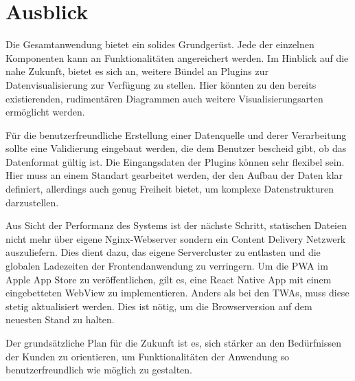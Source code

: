 \chapter{Ausblick}
\label{chap:ausblick}

Die Gesamtanwendung bietet ein solides Grundgerüst. Jede der einzelnen Komponenten
kann an Funktionalitäten angereichert werden. Im Hinblick auf die nahe Zukunft, bietet es sich an,
weitere Bündel an Plugins zur Datenvisualisierung zur Verfügung zu stellen. Hier könnten
zu den bereits existierenden, rudimentären Diagrammen auch weitere Visualisierungsarten ermöglicht
werden.

Für die benutzerfreundliche Erstellung einer Datenquelle und derer Verarbeitung
sollte eine Validierung eingebaut werden, die dem Benutzer bescheid gibt, ob das Datenformat
gültig ist. Die Eingangsdaten der Plugins können sehr flexibel sein. Hier muss an einem Standart
gearbeitet werden, der den Aufbau der Daten klar definiert, allerdings auch genug Freiheit bietet,
um komplexe Datenstrukturen darzustellen.

Aus Sicht der Performanz des Systems ist der nächste
Schritt, statischen Dateien nicht mehr über eigene Nginx-Webserver sondern ein
Content Delivery Netzwerk auszuliefern. Dies dient dazu, das eigene Servercluster
zu entlasten und die globalen Ladezeiten der Frontendanwendung zu verringern.
Um die PWA im Apple App Store zu veröffentlichen, gilt es, eine React Native
App mit einem eingebetteten WebView zu implementieren. Anders als bei den TWAs, muss
diese stetig aktualisiert werden. Dies ist nötig, um die Browserversion auf
dem neuesten Stand zu halten.

Der grundsätzliche Plan für die Zukunft ist es, sich stärker an den
Bedürfnissen der Kunden zu orientieren, um Funktionalitäten der Anwendung
so benutzerfreundlich wie möglich zu gestalten.
